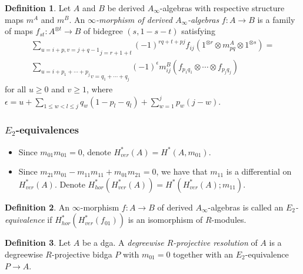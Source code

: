 \documentclass{beamer}
\theoremstyle{definition}
\newtheorem{defi}{Definition}
\begin{document}
\begin{frame}
\begin{defi}
Let $A$ and $B$ be derived $A_\infty$-algebras with respective structure maps $m^A$ and $m^B$. An \emph{$\infty$-morphism of derived $A_\infty$-algebras} $f:A\to B$ is a family of maps $f_{st}:A^{\otimes t}\to B$ of bidegree $(s,1-s-t)$ satisfying
\begin{align*}
\underset{j=r+1+t}{\sum_{u=i+p, v=j+q-1}}(-1)^{rq+t+pj}f_{ij}(1^{\otimes r}\otimes m_{pq}^A\otimes 1^{\otimes s})=\\
\underset{v=q_1+\cdots +q_j}{\sum_{u=i+p_1+\cdots +p_j}}(-1)^{\epsilon} m^B_{ij}(f_{p_1 q_1}\otimes\cdots\otimes f_{p_j q_j})
\end{align*}
for all $u\geq 0$ and $v\geq 1$, where
$\epsilon = u + \sum_{1\leq w < l \leq j} q_w(1-p_l-q_l)  + \sum_{w=1}^j p_w(j-w)$.
\end{defi}
\end{frame}

\begin{frame}
\frametitle{$E_2$-equivalences}
\begin{itemize}
\item<1-> Since $m_{01}m_{01}=0$, denote $H^*_{ver}(A)=H^*(A,m_{01})$. 
\item<2-> Since $m_{21}m_{01} - m_{11}m_{11} + m_{01}m_{21} = 0$, we have that $m_{11}$ is a differential on $H^*_{ver}(A)$. Denote $H^*_{hor}(H^*_{ver}(A)) = H^*(H^*_{ver}(A);m_{11})$.
\end{itemize}\pause
\pause
\begin{defi}
An $\infty$-morphism $f : A \to B$ of derived $A_\infty$-algebras
is called an \emph{$E_2$-equivalence} if $H^*_{hor}(H^*_{ver}(f_{01}))$
is an isomorphism of $R$-modules.
\end{defi}\pause
\begin{defi}
Let $A$ be a dga. A \emph{degreewise $R$-projective
resolution} of $A$ is a degreewise $R$-projective
bidga $P$ with $m_{01} = 0$ together with an $E_2$-equivalence $P \to A$.
\end{defi}
\end{frame}
\end{document}
